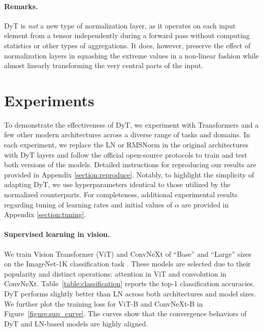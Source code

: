 \vskip 0.2cm
\paragraph{Remarks.} DyT is \emph{not} a new type of normalization layer, as it operates on each input element from a tensor independently during a forward pass without computing statistics or other types of aggregations. It does, however, preserve the effect of normalization layers in squashing the extreme values in a non-linear fashion while almost linearly transforming the very central parts of the input.




\section{Experiments}
\label{section:experiments}

\vskip 0.2cm
To demonstrate the effectiveness of DyT, we experiment with Transformers and a few other modern architectures across a diverse range of tasks and domains.
In each experiment, we replace the LN or RMSNorm in the original architectures with DyT layers and follow the official open-source protocols to train and test both versions of the models. Detailed instructions for reproducing our results are provided in Appendix \ref{section:reproduce}.
Notably, to highlight the simplicity of adapting DyT, we use hyperparameters identical to those utilized by the normalized counterparts.
For completeness, additional experimental results regarding tuning of learning rates and initial values of $\alpha$ are provided in Appendix \ref{section:tuning}.


\vskip 0.2cm
\paragraph{Supervised learning in vision.}
We train Vision Transformer (ViT) \citep{dosovitskiy2020image} and ConvNeXt \citep{liu2022convnet} of ``Base'' and ``Large'' sizes on the ImageNet-1K classification task \citep{deng2009imagenet}.
These models are selected due to their popularity and distinct operations: attention in ViT and convolution in ConvNeXt.
Table~\ref{table:classification} reports the top-1 classification accuracies.
DyT performs slightly better than LN across both architectures and model sizes.
We further plot the training loss for ViT-B and ConvNeXt-B in Figure~\ref{figure:sup_curve}. The curves show that the convergence behaviors of DyT and LN-based models are highly aligned.

